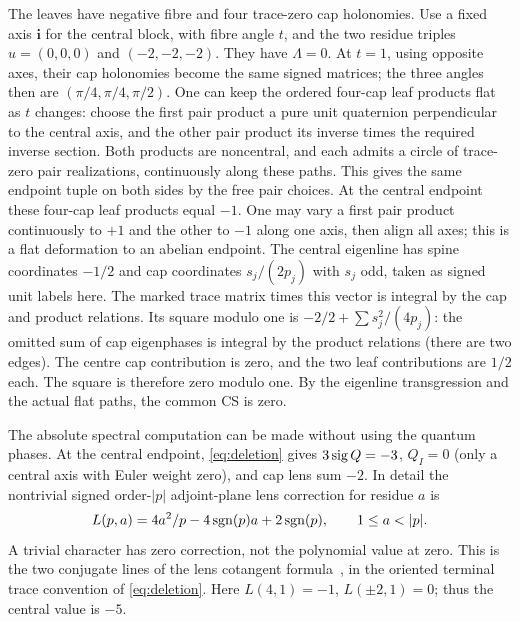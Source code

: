 The leaves have negative fibre and four trace-zero cap holonomies. Use a fixed axis \(\mathbf i\) for the central block, with fibre angle \(t\), and the two residue triples \(u=(0,0,0)\) and \((-2,-2,-2)\). They have \(\Lambda=0\). At \(t=1\), using opposite axes, their cap holonomies become the same signed matrices; the three angles then are \((\pi/4,\pi/4,\pi/2)\). One can keep the ordered four-cap leaf products flat as \(t\) changes: choose the first pair product a pure unit quaternion perpendicular to the central axis, and the other pair product its inverse times the required inverse section. Both products are noncentral, and each admits a circle of trace-zero pair realizations, continuously along these paths. This gives the same endpoint tuple on both sides by the free pair choices. At the central endpoint these four-cap leaf products equal \(-1\). One may vary a first pair product continuously to \(+1\) and the other to \(-1\) along one axis, then align all axes; this is a flat deformation to an abelian endpoint. The central eigenline has spine coordinates \(-1/2\) and cap coordinates \(s_j/(2p_j)\) with \(s_j\) odd, taken as signed unit labels here. The marked trace matrix times this vector is integral by the cap and product relations. Its square modulo one is \(-2/2+\sum s_j^2/(4p_j)\): the omitted sum of cap eigenphases is integral by the product relations (there are two edges). The centre cap contribution is zero, and the two leaf contributions are \(1/2\) each. The square is therefore zero modulo one. By the eigenline transgression and the actual flat paths, the common CS is zero.

The absolute spectral computation can be made without using the quantum phases. At the central endpoint, \eqref{eq:deletion} gives \(3\operatorname{sig} Q=-3\), \(Q_I=0\) (only a central axis with Euler weight zero), and cap lens sum \(-2\). In detail the nontrivial signed order-\(|p|\) adjoint-plane lens correction for residue \(a\) is
\[
 L(p,a)=4a^2/p-4\sgn(p)a+2\sgn(p),\qquad 1\le a<|p|.
\]
A trivial character has zero correction, not the polynomial value at zero. This is the two conjugate lines of the lens cotangent formula~\cite[Sec.\ 2.3]{Toffoli}, in the oriented terminal trace convention of \eqref{eq:deletion}. Here \(L(4,1)=-1\), \(L(\pm2,1)=0\); thus the central value is \(-5\).


